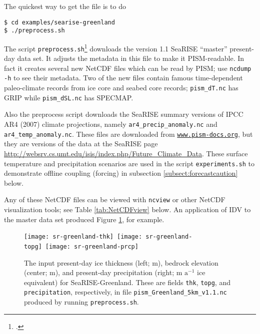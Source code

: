 \centerline{}
\medskip

\noindent The quickest way to get the file is to do
\begin{verbatim}
$ cd examples/searise-greenland
$ ./preprocess.sh
\end{verbatim}
\noindent The script \texttt{preprocess.sh}\footnote{.} downloads the version 1.1 SeaRISE ``master'' present-day data set.  It adjusts the metadata in this file to make it PISM-readable.  In fact it creates several new NetCDF files which can be read by PISM; use \texttt{ncdump -h} to see their metadata.  Two of the new files contain famous time-dependent paleo-climate records from ice core and seabed core records; \texttt{pism_dT.nc} has GRIP while \texttt{pism_dSL.nc} has SPECMAP.

Also the preprocess script downloads the SeaRISE summary versions of IPCC AR4 (2007) climate projections, namely \texttt{ar4_precip_anomaly.nc} and \texttt{ar4_temp_anomaly.nc}.  These files are downloaded from \href{http://www.pism-docs.org/}{\texttt{www.pism-docs.org}}, but they are versions of the data at the SeaRISE page \url{http://websrv.cs.umt.edu/isis/index.php/Future_Climate_Data}.  These surface temperature and precipitation scenarios are used in the script \texttt{experiments.sh} to demonstrate offline coupling (forcing) in subsection \ref{subsect:forecastcaution} below.

Any of these NetCDF files can be viewed with \texttt{ncview} or other NetCDF visualization tools; see Table \ref{tab:NetCDFview} below.  An application of IDV to the master data set produced Figure \ref{fig:sr-input}, for example.

\begin{figure}[ht]
\centering
\mbox{\texttt{[image: sr-greenland-thk]}
  \qquad
  \texttt{[image: sr-greenland-topg]}
  \qquad
  \texttt{[image: sr-greenland-prcp]}}
\caption{The input present-day ice thickness (left; m), bedrock elevation (center; m), and present-day precipitation (right; m $\text{a}^{-1}$ ice equivalent) for SeaRISE-Greenland.  These are fields \texttt{thk}, \texttt{topg}, and \texttt{precipitation}, respectively, in file \texttt{pism_Greenland_5km_v1.1.nc} produced by running \texttt{preprocess.sh}.}
\label{fig:sr-input}
\end{figure}



